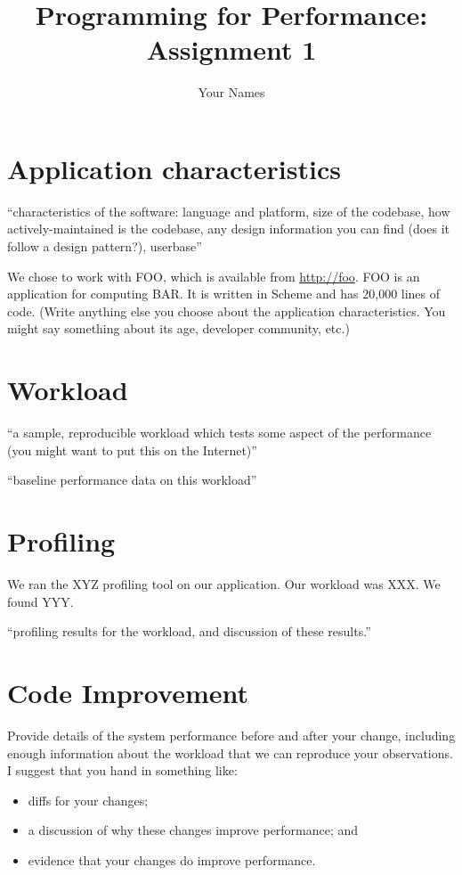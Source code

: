 \documentclass{article}
\begin{document}
\title{Programming for Performance: Assignment 1}
\author{Your Names}
\renewcommand{\today}{}
\maketitle

\section*{Application characteristics}

``characteristics of the software: language and platform, size of the codebase, how actively-maintained is the codebase, any design information you can find (does it follow a design pattern?), userbase''

We chose to work with FOO, which is available from \url{http://foo}.
FOO is an application for computing BAR. It is written in Scheme and
has 20,000 lines of code. (Write anything else you choose about
the application characteristics. You might say something about its
age, developer community, etc.)

\section*{Workload}

``a sample, reproducible workload which tests some aspect of the performance (you might want to put this on the Internet)''

``baseline performance data on this workload''

\section*{Profiling}
We ran the XYZ profiling tool on our application. Our workload was XXX. 
We found YYY.

``profiling results for the workload, and discussion of these results.''

\section*{Code Improvement}
Provide details of the system performance before and after your
change, including enough information about the workload that we can
reproduce your observations. I suggest that you hand in something like:
\begin{itemize}
\item diffs for your changes;
\item a discussion of why these changes improve performance; and
\item evidence that your changes do improve performance.
\end{itemize}
\end{document}
